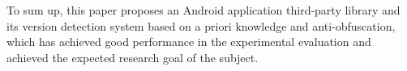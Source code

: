\begin{digest}
To sum up, this paper proposes an Android application third-party library and its version detection system based on a priori knowledge and anti-obfuscation, which has achieved good performance in the experimental evaluation and achieved the expected research goal of the subject.

\end{digest}
